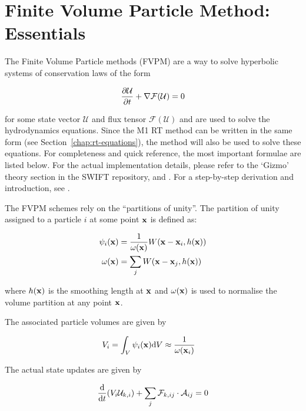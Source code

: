 \section{Finite Volume Particle Method: Essentials} \label{chap:meshless}

The Finite Volume Particle methods (FVPM) are a way to solve hyperbolic systems of conservation
laws of the form

\begin{equation}
    \frac{\partial \mathcal{U}}{\partial t} + \nabla \mathcal{F}(\mathcal{U}) = 0 \label{eq:conservation-law}
\end{equation}

for some state vector $\mathcal{U}$ and flux tensor $\mathcal{F}(\mathcal{U})$
and are used to solve the hydrodynamics equations. Since the M1 RT method can be written in the same
form (see Section~\ref{chap:rt-equations}), the method will also be used to solve these equations.
For completeness and quick reference, the most important formulae are listed below. For the actual
implementation details, please refer to the `Gizmo' theory section in the SWIFT repository, and
\citet{hopkinsGIZMONewClass2015}. For a step-by-step derivation and introduction, see
\citet{ivkovicThesis}.



The FVPM schemes rely on the ``partitions of unity''. The partition of unity assigned to a particle
$i$ at some point $\mathbf{x}$ is defined as:

\begin{align}
	\psi_i(\mathbf{x}) &= \frac{1}{\omega(\mathbf{x})} W(\mathbf{x} - \mathbf{x}_i, h(\mathbf{x}))		\label{eq:psi} \\
	\omega(\mathbf{x}) &= \sum_j W(\mathbf{x} - \mathbf{x}_j, h(\mathbf{x})) 					\label{eq:omega}
\end{align}

where $h(\mathbf{x})$ is the smoothing length at $\mathbf{x}$ and $\omega(\mathbf{x})$ is used to normalise the volume
partition at any point $\mathbf{x}$.

The associated particle volumes are given by

\begin{align}
	V_i &= \int_V \psi_i(\mathbf{x}) \mathrm{d} V \approx \frac{1}{\omega(\mathbf{x}_i)} \label{eq:volume}
\end{align}


The actual state updates are given by

\begin{equation}
	\frac{\mathrm{d}}{\mathrm{d} t} (V_i \mathcal{U}_{k,i}) + \sum_j \mathcal{F}_{k,ij} \cdot \mathcal{A}_{ij} = 0
\end{equation}


